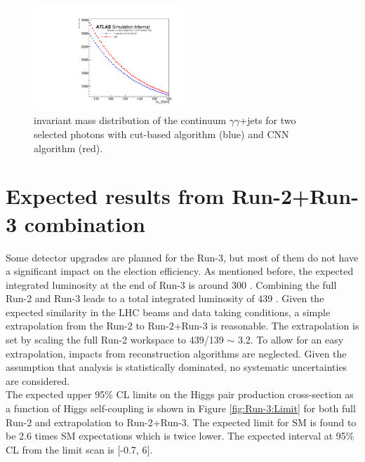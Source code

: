 \begin{figure}[htbp]
    \centering
    \includegraphics[width=0.5\textwidth]{Ch6/Img/Eff_Tight_All_Inclusive_Tight_M.pdf}
     \begin{tcolorbox}[colback=black!5!white, colframe=white!75!black]
    \caption{\myy invariant mass distribution of the continuum $\gamma\gamma$+jets for two selected photons with cut-based algorithm (blue) and CNN algorithm (red).}
    \label{fig:HL-LHC:Run-3:CNN:Cont:M}
    \end{tcolorbox}
\end{figure}

\section{Expected results from Run-2+Run-3 combination}
\label{Run-3}

Some detector upgrades are planned for the Run-3, but most of them do not have a significant impact on the \HHyybb election efficiency.  As mentioned before, the expected integrated luminosity at the end of Run-3 is around 300 \ifb. Combining the full Run-2 and Run-3 leads to a total integrated luminosity of 439 \ifb. Given the expected similarity in the LHC beams and data taking conditions, a simple extrapolation from the Run-2 to Run-2+Run-3 is reasonable. The extrapolation is set by scaling the full Run-2 workspace to 439/139 $\sim$ 3.2. To allow for an easy extrapolation, impacts from reconstruction algorithms are neglected. Given the assumption that \HHyybb analysis is statistically dominated, no systematic uncertainties are considered. \\

The expected upper 95\% CL limits on the Higgs pair production cross-section as a function of Higgs self-coupling \kl is shown in Figure \ref{fig:Run-3:Limit} for both full Run-2 and extrapolation to Run-2+Run-3. The expected limit for SM is found to be 2.6 times SM expectations which is twice lower. The expected \kl interval at 95\% CL from the limit scan is [-0.7, 6].

